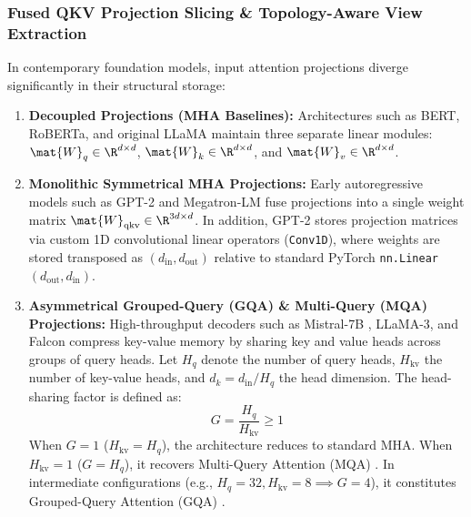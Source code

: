 \subsubsection{Fused QKV Projection Slicing \& Topology-Aware View Extraction}
\label{subsubsec:fused_qkv_slicing}

In contemporary foundation models, input attention projections diverge significantly in their structural storage:
\begin{enumerate}
    \item \textbf{Decoupled Projections (MHA Baselines):} Architectures such as BERT, RoBERTa, and original LLaMA maintain three separate linear modules: $\mat{W}_q \in \R^{d \times d}$, $\mat{W}_k \in \R^{d \times d}$, and $\mat{W}_v \in \R^{d \times d}$.
    \item \textbf{Monolithic Symmetrical MHA Projections:} Early autoregressive models such as GPT-2 \cite{radford2019language} and Megatron-LM fuse projections into a single weight matrix $\mat{W}_{\text{qkv}} \in \R^{3d \times d}$. In addition, GPT-2 stores projection matrices via custom 1D convolutional linear operators (\texttt{Conv1D}), where weights are stored transposed as $(d_{\text{in}}, d_{\text{out}})$ relative to standard PyTorch \texttt{nn.Linear} $(d_{\text{out}}, d_{\text{in}})$.
    \item \textbf{Asymmetrical Grouped-Query (GQA) \& Multi-Query (MQA) Projections:} High-throughput decoders such as Mistral-7B \cite{jiang2023mistral}, LLaMA-3, and Falcon compress key-value memory by sharing key and value heads across groups of query heads. Let $H_q$ denote the number of query heads, $H_{\text{kv}}$ the number of key-value heads, and $d_k = d_{\text{in}} / H_q$ the head dimension. The head-sharing factor is defined as:
    \begin{equation}
        G = \frac{H_q}{H_{\text{kv}}} \ge 1
        \label{eq:gqa_factor}
    \end{equation}
    When $G = 1$ ($H_{\text{kv}} = H_q$), the architecture reduces to standard MHA. When $H_{\text{kv}} = 1$ ($G = H_q$), it recovers Multi-Query Attention (MQA) \cite{shazeer2019fast}. In intermediate configurations (e.g., $H_q = 32, H_{\text{kv}} = 8 \implies G = 4$), it constitutes Grouped-Query Attention (GQA) \cite{ainslie2023gqa}.
\end{enumerate}

